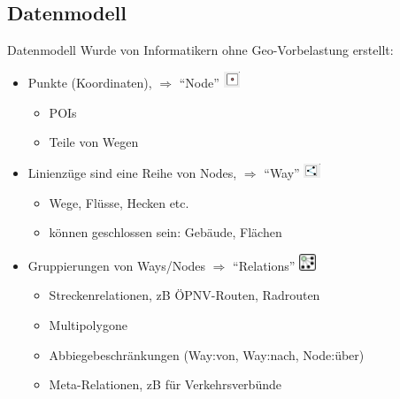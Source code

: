 \documentclass[handout]{beamer}
\begin{document}
\subsection{Datenmodell}

\begin{frame}{Datenmodell}
Wurde von Informatikern ohne Geo-Vorbelastung erstellt:
\begin{itemize}
  \item Punkte (Koordinaten), $\Rightarrow$ "`Node"' \includegraphics[width=0.5cm]{node.png}
  \begin{itemize}
    \item POIs
    \pause
    \item Teile von Wegen
  \end{itemize}
  \item Linienzüge sind eine Reihe von Nodes, $\Rightarrow$ "`Way"' \includegraphics[width=0.5cm]{way.png}
  \begin{itemize}
    \item Wege, Flüsse, Hecken etc.
    \item können geschlossen sein: Gebäude, Flächen
  \end{itemize}
  \pause
  \item Gruppierungen von Ways/Nodes $\Rightarrow$ "`Relations"' \includegraphics[width=0.5cm]{relation.png}
  \begin{itemize}
    \item Streckenrelationen, zB ÖPNV-Routen, Radrouten
    \item Multipolygone 
    \item Abbiegebeschränkungen (Way:von, Way:nach, Node:über)
    \item Meta-Relationen, zB für Verkehrsverbünde
  \end{itemize}
\end{itemize}

\end{frame}
\end{document}

